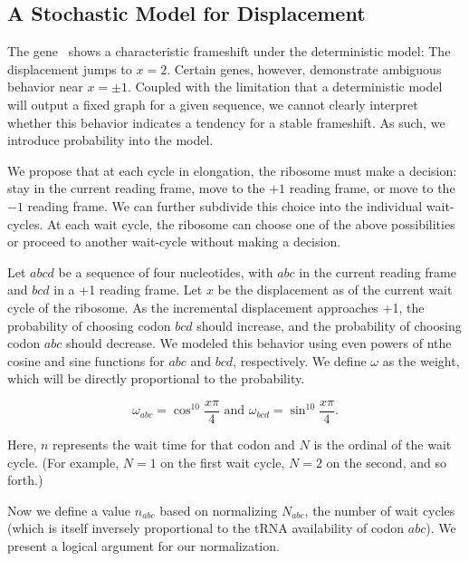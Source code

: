 \documentclass[12pt, draft]{article}
\numberwithin{equation}{section}
\begin{document}
\subsection{A Stochastic Model for Displacement}


The gene \prfB\ shows a characteristic frameshift under the deterministic model: The displacement jumps to $x=2$.
Certain genes, however, demonstrate ambiguous behavior near $x = \pm 1$.
Coupled with the limitation that a deterministic model will output a fixed graph for a given sequence, 
we cannot clearly interpret whether this behavior indicates a tendency for a stable frameshift.
As such, we introduce probability into the model.

We propose that at each cycle in elongation, the ribosome must make a decision: stay in the current reading frame,
move to the $+1$ reading frame,
or move to the $-1$ reading frame.  We can further subdivide this choice into the individual wait-cycles.
At each wait cycle, the ribosome can choose one of the above possibilities or proceed to another wait-cycle without making a decision.

Let $abcd$ be a sequence of four nucleotides, with $abc$ in the
current reading frame and $bcd$ in a +1 reading frame.  Let $x$ be the
displacement as of the current wait cycle of the ribosome.  As the
incremental displacement approaches +1, the probability of choosing
codon $bcd$ should increase, and the probability of choosing codon
$abc$ should decrease.  We modeled this behavior using even powers of
nthe cosine and sine functions for $abc$ and $bcd$, respectively.  We
define $\omega$ as the weight, which will be directly proportional to
the probability.

\begin{equation}
  \omega_{abc} = \cos^{10}{\frac{x\pi}{4}} \text{ and } \omega_{bcd} = \sin^{10}{\frac{x\pi}{4}}.
\end{equation}

Here, $n$ represents the wait time for that codon and $N$ is the ordinal of the wait cycle. (For example,
$N=1$ on the first wait cycle, $N=2$ on the second, and so forth.)

Now we define a value $n_{abc}$ based on normalizing $N_{abc}$, the
number of wait cycles (which is itself inversely proportional to the
tRNA availability of codon $abc$).  We present a logical argument for
our normalization.
\end{document}
